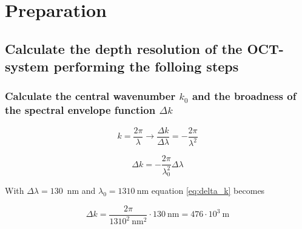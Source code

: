 \chapter{Preparation}
\label{ch.preparation}

\section{Calculate the depth resolution of the OCT-system performing the folloing steps}

\subsection{Calculate the central wavenumber $k_0$ and the broadness of the spectral envelope function $\Delta k$}

\begin{equation}
k=\frac{2\pi}{\lambda} \rightarrow \frac{\Delta k}{\Delta\lambda}=-\frac{2\pi}{\lambda^2} 
\label{eq:delta_k_herleitung}
\end{equation}

\begin{equation}
\Delta k=-\frac{2\pi}{\lambda_0^2}\Delta\lambda
\label{eq:delta_k}
\end{equation}

With $\Delta\lambda = 130$~nm and $\lambda_0=1310~$nm equation \ref{eq:delta_k} becomes

\begin{equation}
\Delta k = \frac{2\pi}{1310 ^2~\mathrm{nm}^2}\cdot130~\mathrm{nm}=476\cdot10^3~\mathrm{m}
\label{eq:}
\end{equation}